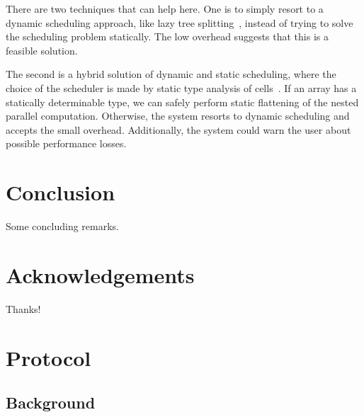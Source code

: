 \documentclass[a4paper]{article}
\begin{document}
There are two techniques that can help here. One is to simply resort to a dynamic scheduling approach, like lazy tree splitting~\cite{Bergstrom:2010:LTS:1863543.1863558}, instead of trying to solve the scheduling problem statically. The low overhead suggests that this is a feasible solution.

The second is a hybrid solution of dynamic and static scheduling, where the choice of the scheduler is made by static type analysis of cells~\cite{Abraham:2006:TIS:1140335.1140346, Cheng2012Abstract, Cheng2015Static}. If an array has a statically determinable type, we can safely perform static flattening of the nested parallel computation. Otherwise, the system resorts to dynamic scheduling and accepts the small overhead. Additionally, the system could warn the user about possible performance losses.

\section{Conclusion}
\label{sec:conclusion}

Some concluding remarks. 

\section*{Acknowledgements}


Thanks!




\appendix

\newpage{}

\section{Protocol}
\label{sec:protocol}

\subsection{Background}
\label{sec:background}
\end{document}
